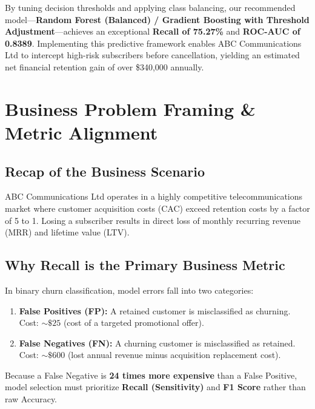 \documentclass[11pt,a4paper]{article}
\begin{document}
By tuning decision thresholds and applying class balancing, our recommended model---\textbf{Random Forest (Balanced) / Gradient Boosting with Threshold Adjustment}---achieves an exceptional \textbf{Recall of 75.27\%} and \textbf{ROC-AUC of 0.8389}. Implementing this predictive framework enables ABC Communications Ltd to intercept high-risk subscribers before cancellation, yielding an estimated net financial retention gain of over \$340,000 annually.

\section{Business Problem Framing \& Metric Alignment}
\subsection{Recap of the Business Scenario}
ABC Communications Ltd operates in a highly competitive telecommunications market where customer acquisition costs (CAC) exceed retention costs by a factor of 5 to 1. Losing a subscriber results in direct loss of monthly recurring revenue (MRR) and lifetime value (LTV).

\subsection{Why Recall is the Primary Business Metric}
In binary churn classification, model errors fall into two categories:
\begin{enumerate}
    \item \textbf{False Positives (FP):} A retained customer is misclassified as churning. Cost: $\sim \$25$ (cost of a targeted promotional offer).
    \item \textbf{False Negatives (FN):} A churning customer is misclassified as retained. Cost: $\sim \$600$ (lost annual revenue minus acquisition replacement cost).
\end{enumerate}
Because a False Negative is \textbf{24 times more expensive} than a False Positive, model selection must prioritize \textbf{Recall (Sensitivity)} and \textbf{F1 Score} rather than raw Accuracy.
\end{document}
